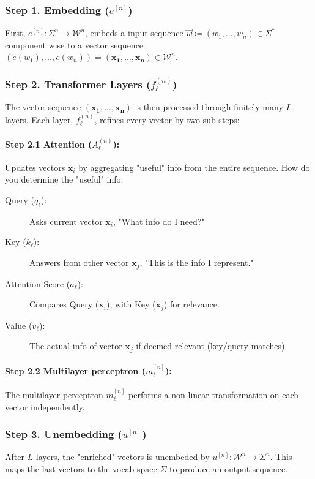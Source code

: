\documentclass[12pt, twoside]{article}
\begin{document}
\subsubsection*{Step 1. Embedding ($e^{[n]}$)}
First, $e^{[n]}: \Sigma^n \to \mathcal{W}^n$, embeds a input sequence $\Vec{w}\coloneqq(w_1,...,w_n)\in \Sigma^*$ component wise to a vector sequence $(e(w_1),...,e(w_n))=(\mathbf{x_1},...,\mathbf{x_n})\in \mathcal{W}^n$.

\subsubsection*{Step 2. Transformer Layers ($f_\ell^{(n)}$)}
The vector sequence $(\mathbf{x_1},...,\mathbf{x_n})$ is then processed through finitely many $L$  layers. Each layer, $f_\ell^{(n)}$, refines every vector by two sub-steps:

\paragraph{Step 2.1 Attention ($A_\ell^{(n)}$):} Updates vectors $\mathbf{x}_i$ by aggregating "useful" info from the entire sequence. How do you determine the "useful" info:
\begin{description}
    \item[Query ($q_\ell$):] Asks current vector $\mathbf{x}_i$, "What info do I need?"
    \item[Key ($k_\ell$):] Answers from other vector $\mathbf{x}_j$, "This is the info I represent."
    \item[Attention Score ($a_\ell$):] Compares Query ($\mathbf{x}_i$), with Key ($\mathbf{x}_j$) for relevance.
    \item[Value ($v_\ell$):] The actual info of vector $\mathbf{x}_j$ if deemed relevant (key/query matches)
\end{description}

\paragraph{Step 2.2 Multilayer perceptron ($m_\ell^{[n]}$):}
The multilayer perceptron $m_\ell^{[n]}$ performs a non-linear transformation on each vector independently.

\subsubsection*{Step 3. Unembedding ($u^{[n]}$)}

After $L$ layers, the "enriched" vectors is unembeded by $u^{[n]}: \mathcal{W}^n \to \Sigma^n$. This maps the last vectors to the vocab space $\Sigma$ to produce an output sequence.
\end{document}
